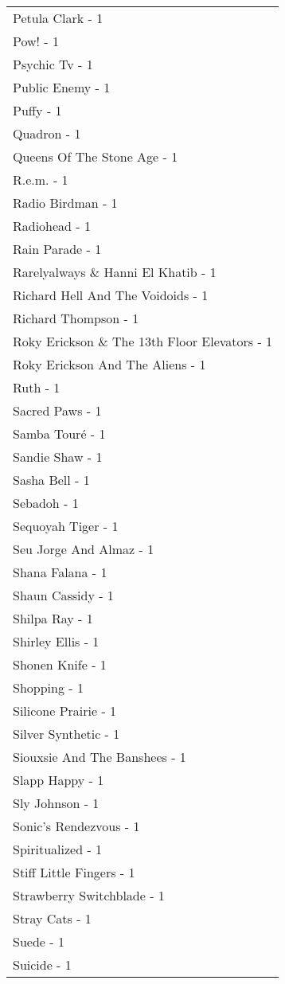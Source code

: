 \documentclass[
]{article}
\begin{document}
\begin{longtable}{l}
Petula Clark - 1 \\ 
Pow! - 1 \\ 
Psychic Tv - 1 \\ 
Public Enemy - 1 \\ 
Puffy - 1 \\ 
Quadron - 1 \\ 
Queens Of The Stone Age - 1 \\ 
R.e.m. - 1 \\ 
Radio Birdman - 1 \\ 
Radiohead - 1 \\ 
Rain Parade - 1 \\ 
Rarelyalways \& Hanni El Khatib - 1 \\ 
Richard Hell And The Voidoids - 1 \\ 
Richard Thompson - 1 \\ 
Roky Erickson \& The 13th Floor Elevators - 1 \\ 
Roky Erickson And The Aliens - 1 \\ 
Ruth - 1 \\ 
Sacred Paws - 1 \\ 
Samba Touré - 1 \\ 
Sandie Shaw - 1 \\ 
Sasha Bell - 1 \\ 
Sebadoh - 1 \\ 
Sequoyah Tiger - 1 \\ 
Seu Jorge And Almaz - 1 \\ 
Shana Falana - 1 \\ 
Shaun Cassidy - 1 \\ 
Shilpa Ray - 1 \\ 
Shirley Ellis - 1 \\ 
Shonen Knife - 1 \\ 
Shopping - 1 \\ 
Silicone Prairie - 1 \\ 
Silver Synthetic - 1 \\ 
Siouxsie And The Banshees - 1 \\ 
Slapp Happy - 1 \\ 
Sly Johnson - 1 \\ 
Sonic's Rendezvous - 1 \\ 
Spiritualized - 1 \\ 
Stiff Little Fingers - 1 \\ 
Strawberry Switchblade - 1 \\ 
Stray Cats - 1 \\ 
Suede - 1 \\ 
Suicide - 1 \\ 

\end{longtable}
\end{document}
